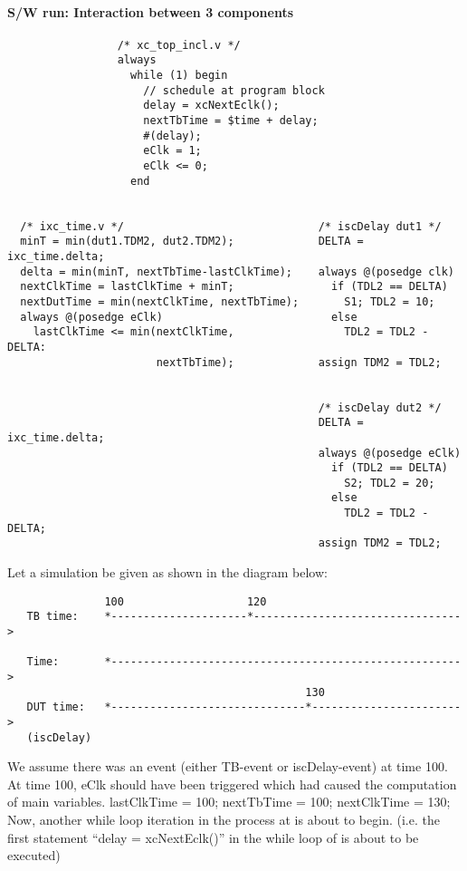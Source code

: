 \documentclass{note}
\begin{document}
\paragraph{S/W run: Interaction between 3 components}
\begin{verbatim}
                 /* xc_top_incl.v */
                 always
                   while (1) begin
                     // schedule at program block
                     delay = xcNextEclk();
                     nextTbTime = $time + delay;
                     #(delay);
                     eClk = 1;
                     eClk <= 0;
                   end


  /* ixc_time.v */                              /* iscDelay dut1 */
  minT = min(dut1.TDM2, dut2.TDM2);             DELTA = ixc_time.delta;
  delta = min(minT, nextTbTime-lastClkTime);    always @(posedge clk)
  nextClkTime = lastClkTime + minT;               if (TDL2 == DELTA)
  nextDutTime = min(nextClkTime, nextTbTime);       S1; TDL2 = 10;
  always @(posedge eClk)                          else
    lastClkTime <= min(nextClkTime,                 TDL2 = TDL2 - DELTA:
                       nextTbTime);             assign TDM2 = TDL2;

 
                                                /* iscDelay dut2 */
                                                DELTA = ixc_time.delta;
                                                always @(posedge eClk)
                                                  if (TDL2 == DELTA)
                                                    S2; TDL2 = 20;
                                                  else
                                                    TDL2 = TDL2 - DELTA;
                                                assign TDM2 = TDL2;
\end{verbatim}
Let a simulation be given as shown in the diagram below:
\begin{verbatim}
               100                   120
   TB time:    *---------------------*-------------------------------->

   Time:       *------------------------------------------------------>
                                              130
   DUT time:   *------------------------------*----------------------->
   (iscDelay)
\end{verbatim}
We assume there was an event (either TB-event or iscDelay-event) at time
100. At time 100, eClk should have been triggered which had caused the
computation of main variables.
  \bit
  \w lastClkTime = 100;
  \w nextTbTime = 100;
  \w nextClkTime = 130;
  \eit
Now, another while loop iteration in the process at  is
about to begin. (i.e. the first statement ``delay = xcNextEclk()'' in the
while loop of  is about to be executed)
\end{document}
